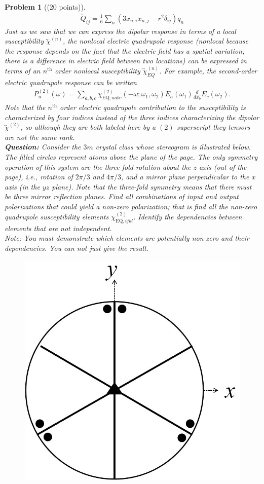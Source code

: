 \documentclass[UTF8,10pt,a4paper]{article}
\theoremstyle{Problem}
\newtheorem{prob}{Problem}
\theoremstyle{Solution}
\begin{document}
\begin{prob}[(20 points)]
    \begin{align}
        \overleftrightarrow{Q}_{ij}=\frac{1}{6}\sum_n(3x_{n,i}x_{n,j}-r^2\delta_{ij})q_n
    \end{align}
    Just as we saw that we can express the dipolar response in terms of a \textit{local} susceptibility $\overleftrightarrow{\chi}^{(n)}$, the \textit{nonlocal} electric quadrupole response (nonlocal because the response depends on the fact that the electric field has a spatial variation; there is a difference in electric field between two locations) can be expressed in terms of an $n^{\text{th}}$ order nonlocal susceptibility $\overleftrightarrow{\chi}_{EQ}^{(n)}$. For example, the second-order electric quadrupole response can be written
    \begin{align}
        P_u^{(2)}(\omega)=\sum_{a,b,c}\chi_{\text{EQ},uabc}^{(2)}(-\omega;\omega_1,\omega_2)E_a(\omega_1)\frac{d}{dx_b}E_c(\omega_2).
    \end{align}
    Note that the $n^{\text{th}}$ order electric quadrupole contribution to the susceptibility is characterized by four indices instead of the three indices characterizing the dipolar $\overleftrightarrow{\chi}^{(2)}$, so although they are both labeled here by a $(2)$ superscript they tensors are not the same rank.\\
    \textbf{Question:} Consider the $3m$ crystal class whose stereogram is illustrated below. The filled circles represent atoms above the plane of the page. The only symmetry operation of this system are the three-fold rotation about the $z$ axis (out of the page), i.e., rotation of $2\pi/3$ and $4\pi/3$, and a mirror plane perpendicular to the $x$ axis (in the $yz$ plane). Note that the three-fold symmetry means that there must be three mirror reflection planes. Find all combinations of input and output polarizations that could yield a non-zero polarization; that is find all the non-zero quadrupole susceptibility elements $\chi_{\text{EQ},ijkl}^{(2)}$. Identify the dependencies between elements that are not independent.\\
    Note: You must demonstrate which elements are potentially non-zero and their dependencies. You can not just give the result.
    \begin{figure}[h]
        \centering
        \includegraphics[width=.16\textwidth]{stereogram-3m.jpg}
    \end{figure}
\end{prob}
\end{document}
